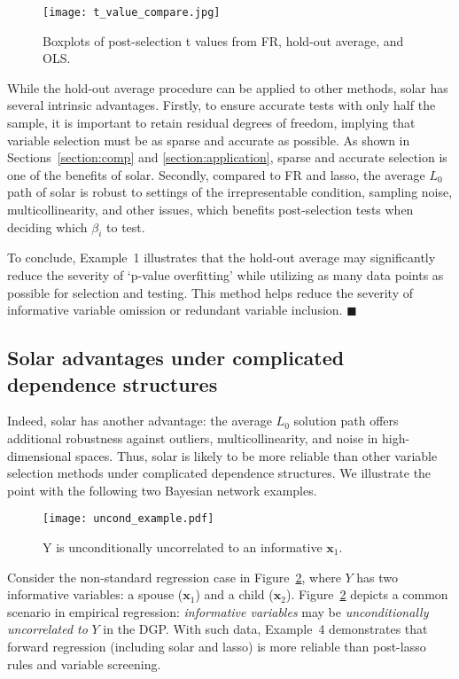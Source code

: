 \documentclass[11pt,authoryear]{elsarticle}
\begin{document}
\begin{figure}[h]
%
  \centering
%
  \texttt{[image: t\_value\_compare.jpg]}
%
  \caption{Boxplots of post-selection t values from FR, hold-out average, and OLS.}
%
  \label{fig:t_value_compare}
%
\end{figure}

While the hold-out average procedure can be applied to other methods, solar has several intrinsic advantages. Firstly, to ensure accurate tests with only half the sample, it is important to retain residual degrees of freedom, implying that variable selection must be as sparse and accurate as possible. As shown in Sections~\ref{section:comp} and \ref{section:application}, sparse and accurate selection is one of the benefits of solar. Secondly, compared to FR and lasso, the average $L_0$ path of solar is robust to settings of the irrepresentable condition, sampling noise, multicollinearity, and other issues, which benefits post-selection tests when deciding which $\beta_i$ to test. 

To conclude, Example~1 illustrates that the hold-out average may significantly reduce the severity of `p-value overfitting' while utilizing as many data points as possible for selection and testing. This method helps reduce the severity of informative variable omission or redundant variable inclusion. $\blacksquare$

\subsection{Solar advantages under complicated dependence structures\label{section:example}}

Indeed, solar has another advantage: the average $L_0$ solution path offers additional robustness against outliers, multicollinearity, and noise in high-dimensional spaces. Thus, solar is likely to be more reliable than other variable selection methods under complicated dependence structures. We illustrate the point with the following two Bayesian network examples.

\begin{figure}[h]
%
  \centering
  \texttt{[image: uncond\_example.pdf]}
  \caption{Y is unconditionally uncorrelated to an informative $\mathbf{x}_1$.}
  \label{fig:uncond_example}
%
\end{figure}

Consider the non-standard regression case in Figure~\ref{fig:uncond_example}, where $Y$ has two informative variables: a spouse ($\mathbf{x}_1$) and a child ($\mathbf{x}_2$). Figure~\ref{fig:uncond_example} depicts a common scenario in empirical regression: \emph{informative variables} may be \emph{unconditionally uncorrelated to} $Y$ in the DGP. With such data, Example~4 demonstrates that forward regression (including solar and lasso) is more reliable than post-lasso rules and variable screening.
\end{document}
